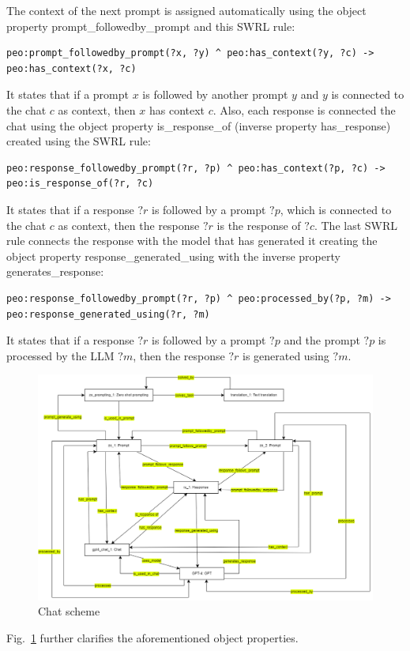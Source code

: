 The context of the next prompt is assigned automatically using the object property prompt\_followedby\_prompt and this SWRL rule:
\begin{lstlisting}
peo:prompt_followedby_prompt(?x, ?y) ^ peo:has_context(?y, ?c) -> peo:has_context(?x, ?c)
\end{lstlisting}
It states that if a prompt $x$ is followed by another prompt $y$ and $y$ is connected to the chat $c$ as context, then $x$ has context $c$.
Also, each response is connected the chat using the object property is\_response\_of (inverse property has\_response) created using the SWRL rule:
\begin{lstlisting}
peo:response_followedby_prompt(?r, ?p) ^ peo:has_context(?p, ?c) -> peo:is_response_of(?r, ?c)
\end{lstlisting}
It states that if a response $?r$ is followed by a prompt $?p$, which is connected to the chat $c$ as context, then the response $?r$ is the response of $?c$.
The last SWRL rule connects the response with the model that has generated it creating the object property response\_generated\_using with the inverse property generates\_response:
\begin{lstlisting}
peo:response_followedby_prompt(?r, ?p) ^ peo:processed_by(?p, ?m) -> peo:response_generated_using(?r, ?m) 
\end{lstlisting}
It states that if a response $?r$ is followed by a prompt $?p$ and the prompt $?p$ is processed by the LLM $?m$, then the response $?r$ is generated using $?m$.
\begin{figure}[H]
    \centering
    \includegraphics[width=0.85\linewidth]{Figures/fig_31.png}
    \caption{Chat scheme}
    \label{fig:31}
\end{figure}
Fig.~\ref{fig:31} further clarifies the aforementioned object properties.

